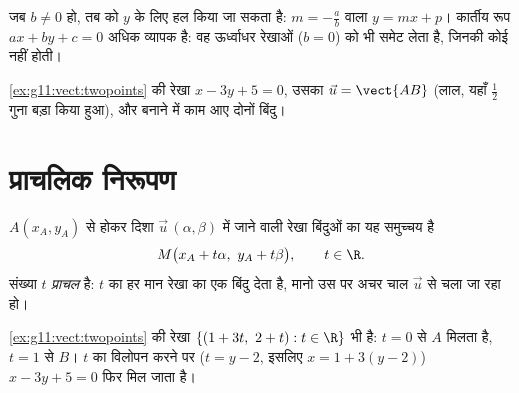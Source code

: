 \begin{remark}
जब $b \neq 0$ हो, तब  को $y$ के लिए हल किया जा सकता है:  $m = -\frac ab$
वाला $y = mx + p$। कार्तीय रूप $ax + by + c = 0$ अधिक व्यापक है: वह ऊर्ध्वाधर रेखाओं ($b = 0$)
को भी समेट लेता है, जिनकी कोई  नहीं होती।
\end{remark}

\begin{omfigure}

{\small \cref{ex:g11:vect:twopoints} की रेखा $x - 3y + 5 = 0$, उसका  $\vec u = \vect{AB}$ (लाल, यहाँ $\frac12$ गुना
बड़ा किया हुआ), और  बनाने में काम आए दोनों बिंदु।}
\end{omfigure}

\section{प्राचलिक निरूपण}

\begin{definition}[प्राचलिक निरूपण]\label{def:g11:vect:parametric}
$A(x_A, y_A)$ से होकर दिशा $\vec u\,(\alpha, \beta)$ में जाने वाली रेखा बिंदुओं का यह समुच्चय है
\[
M\bigl(x_A + t\alpha,\ y_A + t\beta\bigr), \qquad t \in \R .
\]
संख्या $t$ \emph{प्राचल} है: $t$ का हर मान रेखा का एक बिंदु देता है,
मानो उस पर अचर चाल $\vec u$ से चला जा रहा हो।
\end{definition}

\begin{example}
\cref{ex:g11:vect:twopoints} की रेखा $\{(1 + 3t,\ 2 + t) : t \in \R\}$ भी है: $t = 0$ से $A$ मिलता है, $t = 1$ से $B$। $t$
का विलोपन करने पर ($t = y - 2$, इसलिए $x = 1 + 3(y-2)$) $x - 3y + 5 = 0$ फिर मिल जाता है।
\end{example}

